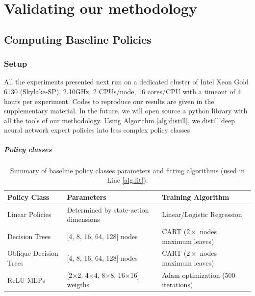 \chapter{Validating our methodology}\label{sec:exps1}

\section{Computing Baseline Policies}

\subsection{Setup}
All the experiments presented next run on a dedicated cluster of Intel Xeon Gold 6130 (Skylake-SP), 2.10GHz, 2 CPUs/node, 16 cores/CPU with a timeout of 4 hours per experiment. Codes to reproduce our results are given in the supplementary material. In the future, we will open source a python library with all the tools of our methodology.
Using Algorithm \ref{alg:distill}, we distill deep neural network expert policies into less complex policy classes.

\paragraph{Policy classes}

\begin{table}[ht]
\centering
\small
\begin{tabular}{lll}
\hline
\textbf{Policy Class} & \textbf{Parameters} & \textbf{Training Algorithm} \\
\hline
Linear Policies & Determined by state-action dimensions & Linear/Logistic Regression \\
Decision Trees & [4, 8, 16, 64, 128] nodes & CART ($2\times$ nodes maximum leaves) \\
Oblique Decision Trees & [4, 8, 16, 64, 128] nodes & CART ($2\times$ nodes maximum leaves) \\
ReLU MLPs & [2$\times$2, 4$\times$4, 8$\times$8, 16$\times$16] weigths & Adam optimization (500 iterations) \\
\hline
\end{tabular}
\caption{Summary of baseline policy classes parameters and fitting algorithms (used in Line \ref{alg:fit}).}
\label{tab:policy-classes}
\end{table}

